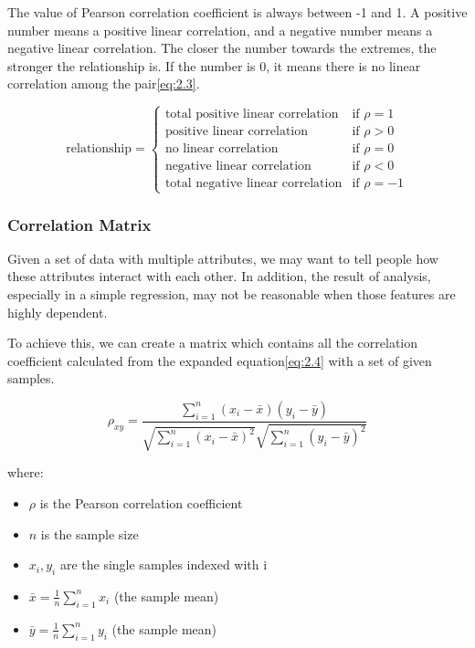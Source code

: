 \documentclass[11pt]{article} %
\theoremstyle{plain}
\theoremstyle{definition}
\begin{document}
The value of Pearson correlation coefficient is always between -1 and 1. A positive number means a positive linear correlation, and a negative number means a negative linear correlation. The closer the number towards the extremes, the stronger the relationship is. If the number is 0, it means there is no linear correlation among the pair\eqref{eq:2.3}.

\begin{equation}
  \label{eq:2.3}
  \tag{2.3}
  \text{relationship} = 
  \begin{cases} 
    \text{total positive linear correlation} & \text{if } \rho = 1 \\
    \text{positive linear correlation} & \text{if } \rho > 0 \\
    \text{no linear correlation} & \text{if } \rho = 0 \\
    \text{negative linear correlation} & \text{if } \rho < 0 \\
    \text{total negative linear correlation} & \text{if } \rho = -1
  \end{cases}
\end{equation}

\subsubsection{Correlation Matrix}

Given a set of data with multiple attributes, we may want to tell people how these attributes interact with each other. In addition, the result of analysis, especially in a simple regression, may not be reasonable when those features are highly dependent.

To achieve this, we can create a matrix which contains all the correlation coefficient calculated from the expanded equation\eqref{eq:2.4} with a set of given samples.

{
  \begin{equation}
    \label{eq:2.4}
    \tag{2.4}
    {\rho_{xy}={\frac {\sum _{i=1}^{n}(x_{i}-{\bar {x}})(y_{i}-{\bar {y}})}{{\sqrt {\sum _{i=1}^{n}(x_{i}-{\bar {x}})^{2}}}{\sqrt {\sum _{i=1}^{n}(y_{i}-{\bar {y}})^{2}}}}}}
  \end{equation}

  \footnotesize
  where:
  \begin{itemize}[label=-, leftmargin=4em, itemsep=0.1em]
    \item ${\rho}$ is the Pearson correlation coefficient
    \item ${n}$ is the sample size
    \item $x_{i}, y_{i}$ are the single samples indexed with i
    \item ${\bar {x}}={\frac {1}{n}}\sum _{i=1}^{n}x_{i}$ (the sample mean)
    \item ${\bar {y}}={\frac {1}{n}}\sum _{i=1}^{n}y_{i}$ (the sample mean)
  \end{itemize}
}
\end{document}
